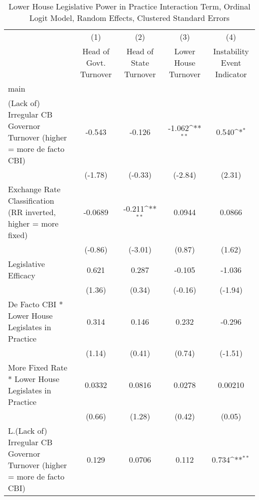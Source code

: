 {
\def\sym#1{\ifmmode^{#1}\else\(^{#1}\)\fi}
\begin{longtable}{l*{4}{c}}
\caption{Lower House Legislative Power in Practice Interaction Term, Ordinal Logit Model, Random Effects, Clustered Standard Errors \label{llpintlagordLogDF}}\\
\hline\hline\endfirsthead\hline\endhead\hline\endfoot\endlastfoot
                &\multicolumn{1}{c}{(1)}&\multicolumn{1}{c}{(2)}&\multicolumn{1}{c}{(3)}&\multicolumn{1}{c}{(4)}\\
                &\multicolumn{1}{c}{Head of Govt. Turnover}&\multicolumn{1}{c}{Head of State Turnover}&\multicolumn{1}{c}{Lower House Turnover}&\multicolumn{1}{c}{Instability Event Indicator}\\
\hline
main            &                  &                  &                  &                  \\
(Lack of) Irregular CB Governor Turnover (higher = more de facto CBI)&   -0.543         &   -0.126         &   -1.062\sym{**} &    0.540\sym{*}  \\
                &  (-1.78)         &  (-0.33)         &  (-2.84)         &   (2.31)         \\
[1em]
Exchange Rate Classification (RR inverted, higher = more fixed)&  -0.0689         &   -0.211\sym{**} &   0.0944         &   0.0866         \\
                &  (-0.86)         &  (-3.01)         &   (0.87)         &   (1.62)         \\
[1em]
Legislative Efficacy&    0.621         &    0.287         &   -0.105         &   -1.036         \\
                &   (1.36)         &   (0.34)         &  (-0.16)         &  (-1.94)         \\
[1em]
De Facto CBI * Lower House Legislates in Practice&    0.314         &    0.146         &    0.232         &   -0.296         \\
                &   (1.14)         &   (0.41)         &   (0.74)         &  (-1.51)         \\
[1em]
More Fixed Rate * Lower House Legislates in Practice&   0.0332         &   0.0816         &   0.0278         &  0.00210         \\
                &   (0.66)         &   (1.28)         &   (0.42)         &   (0.05)         \\
[1em]
L.(Lack of) Irregular CB Governor Turnover (higher = more de facto CBI)&    0.129         &   0.0706         &    0.112         &    0.734\sym{**} \\

\end{longtable}}
